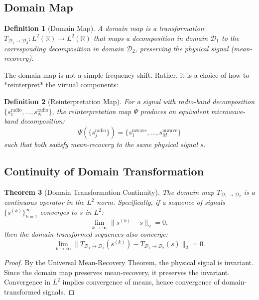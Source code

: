 \documentclass[twocolumn,11pt,a4paper]{article}
\newtheorem{theorem}{Theorem}[section]
\newtheorem{definition}[theorem]{Definition}
\newcommand{\signal}{s}
\newcommand{\domain}{\mathcal{D}}
\begin{document}
\subsection{Domain Map}

\begin{definition}[Domain Map]
A \emph{domain map} is a transformation $T_{\domain_1 \to \domain_2}: L^2(\mathbb{R}) \to L^2(\mathbb{R})$ that maps a decomposition in domain $\domain_1$ to the corresponding decomposition in domain $\domain_2$, preserving the physical signal (mean-recovery).
\end{definition}

The domain map is not a simple frequency shift. Rather, it is a choice of how to *reinterpret* the virtual components:

\begin{definition}[Reinterpretation Map]
For a signal with radio-band decomposition $\{\signal_1^{\text{radio}}, \ldots, \signal_N^{\text{radio}}\}$, the \emph{reinterpretation map} $\Psi$ produces an equivalent microwave-band decomposition:
\begin{equation}
  \Psi(\{\signal_j^{\text{radio}}\}) = \{\signal_1^{\text{mwave}}, \ldots, \signal_M^{\text{mwave}}\}
\end{equation}
such that both satisfy mean-recovery to the same physical signal $\signal$.
\end{definition}

\subsection{Continuity of Domain Transformation}

\begin{theorem}[Domain Transformation Continuity]
The domain map $T_{\domain_1 \to \domain_2}$ is a continuous operator in the $L^2$ norm. Specifically, if a sequence of signals $\{\signal^{(k)}\}_{k=1}^\infty$ converges to $\signal$ in $L^2$:
\begin{equation}
  \lim_{k \to \infty} \| \signal^{(k)} - \signal \|_2 = 0,
\end{equation}
then the domain-transformed sequences also converge:
\begin{equation}
  \lim_{k \to \infty} \| T_{\domain_1 \to \domain_2}(\signal^{(k)}) - T_{\domain_1 \to \domain_2}(\signal) \|_2 = 0.
\end{equation}
\end{theorem}

\begin{proof}
By the Universal Mean-Recovery Theorem, the physical signal is invariant. Since the domain map preserves mean-recovery, it preserves the invariant. Convergence in $L^2$ implies convergence of means, hence convergence of domain-transformed signals.
\end{proof}
\end{document}
